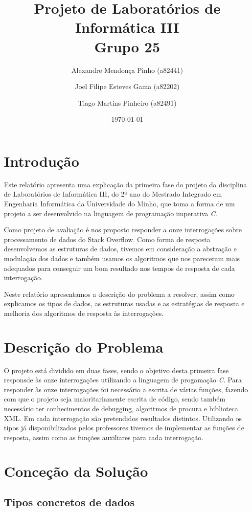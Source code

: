 \documentclass[10pt]{report}
\title{Projeto de Laboratórios de Informática III\\Grupo 25	}
\author{Alexandre Mendonça Pinho (a82441) \and Joel Filipe Esteves Gama (a82202) \and Tiago Martins Pinheiro (a82491)}
\date{\today}
\newcommand\tab[1][0.5cm]{\hspace*{#1}}
\begin{document}
\maketitle

\tableofcontents
\chapter{Introdução}
\label{sec:intro}

\tab Este relatório apresenta uma explicação da primeira fase do projeto da disciplina de Laboratórios de Informática III, do 2º ano do Mestrado Integrado em Engenharia Informática da Universidade do Minho, que toma a forma de um projeto a ser desenvolvido na linguagem de programação imperativa \textit{C}.

Como projeto de avaliação é nos proposto responder a onze interrogações sobre processamento de dados do Stack Overflow. Como forma de resposta desenvolvemos as estruturas de dados, tivemos em consideração a abstração e modulação dos dados e também usamos os algoritmos que nos pareceram mais adequados para conseguir um bom resultado nos tempos de resposta de cada interrogação.

Neste relatório apresentamos a descrição do problema a resolver, assim como explicamos os tipos de dados, as estruturas usadas e as estratégias de resposta e melhoria dos algoritmos de resposta às interrogações.
\chapter{Descrição do Problema}
\label{sec:problema}

\tab O projeto está dividido em duas fases, sendo o objetivo desta primeira fase responsde às onze interrogações utilizando a linguagem de progamação \textit{C}. Para responder às onze interrogações foi necessário a escrita de várias funções, fazendo com que o projeto seja maioritariamente escrita de código, sendo também necessário ter conhecimentos de debugging, algoritmos de procura e biblioteca XML.
Em cada interrogação são pretendidos resultados distintos. Utilizando os tipos já disponibilizados pelos professores tivemos de implementar as funções de resposta, assim como as funções auxiliares para cada interrogação.

\iffalse
\chapter{Conceção da Solução}
\section{Tipos concretos de dados}
\end{document}
